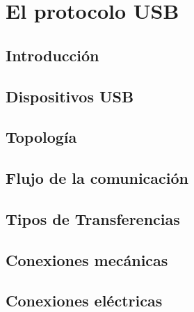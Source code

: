 \chapter{El protocolo USB}
	\label{cap:usb}
	
		\section{Introducción}
			\label{usb:ov}
			
		\section{Dispositivos USB}
		\section{Topología}
		\section{Flujo de la comunicación}
		\section{Tipos de Transferencias}
		\section{Conexiones mecánicas}
		\section{Conexiones eléctricas}